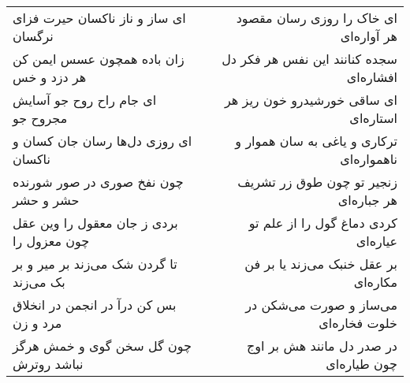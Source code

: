 \begin{center}
\begin{longtable}{l p{0.5cm} r}
ای ساز و ناز ناکسان حیرت فزای نرگسان
&&
ای خاک را روزی رسان مقصود هر آواره‌ای
\\
زان باده همچون عسس ایمن کن هر دزد و خس
&&
سجده کنانند این نفس هر فکر دل افشاره‌ای
\\
ای جام راح روح جو آسایش مجروح جو
&&
ای ساقی خورشیدرو خون ریز هر استاره‌ای
\\
ای روزی دل‌ها رسان جان کسان و ناکسان
&&
ترکاری و یاغی به سان هموار و ناهمواره‌ای
\\
چون نفخ صوری در صور شورنده حشر و حشر
&&
زنجیر تو چون طوق زر تشریف هر جباره‌ای
\\
بردی ز جان معقول را وین عقل چون معزول را
&&
کردی دماغ گول را از علم تو عیاره‌ای
\\
تا گردن شک می‌زند بر میر و بر بک می‌زند
&&
بر عقل خنبک می‌زند یا بر فن مکاره‌ای
\\
بس کن درآ در انجمن در انخلاق مرد و زن
&&
می‌ساز و صورت می‌شکن در خلوت فخاره‌ای
\\
چون گل سخن گوی و خمش هرگز نباشد روترش
&&
در صدر دل مانند هش بر اوج چون طیاره‌ای
\\
\end{longtable}
\end{center}
